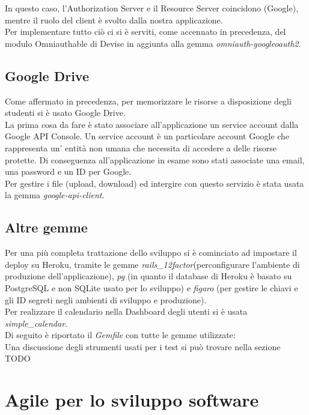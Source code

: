 \documentclass[Lau, binding=0.6cm]{sapthesis}
\begin{document}
In questo caso, l’Authorization Server e il Resource Server coincidono (Google), mentre il ruolo del client è svolto dalla nostra applicazione.\\
Per implementare tutto ciò ci si è serviti, come accennato in precedenza, del modulo Omniauthable di Devise in aggiunta alla gemma \textit{omniauth-googleoauth2}.

\subsection{Google Drive}

Come affermato in precedenza, per memorizzare le risorse a disposizione degli studenti si è usato Google Drive.\\
La prima cosa da fare è stato associare all'applicazione un service account dalla Google API Console. Un service account è un particolare account Google che rappresenta un' entità non umana che necessita di accedere a delle risorse protette. Di conseguenza all'applicazione in esame sono stati associate una email, una password e un ID per Google.\\
Per gestire i file (upload, download) ed intergire con questo servizio è stata usata la gemma \textit{google-api-client}.

\subsection{Altre gemme}

Per una più completa trattazione dello sviluppo si è cominciato ad impostare il deploy su Heroku, tramite le gemme \textit{rails\_12factor}(perconfigurare l'ambiente di produzione dell'applicazione), \textit{pg} (in quanto il database di Heroku è basato su PostgreSQL e non SQLite usato per lo sviluppo) e \textit{figaro} (per gestire le chiavi e gli ID segreti negli ambienti di sviluppo e produzione).\\
Per realizzare il calendario nella Dashboard degli utenti si è usata \textit{simple\_calendar}.\\
Di seguito è riportato il \textit{Gemfile} con tutte le gemme utilizzate:\\



Una discussione degli strumenti usati per i test si può trovare nella sezione TODO\\

\section{Agile per lo sviluppo software}
\end{document}
